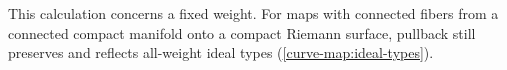 This calculation concerns a fixed weight. For maps with connected
fibers from a connected compact manifold onto a compact Riemann
surface, pullback still preserves and reflects all-weight ideal
types (\cref{curve-map:ideal-types}).




